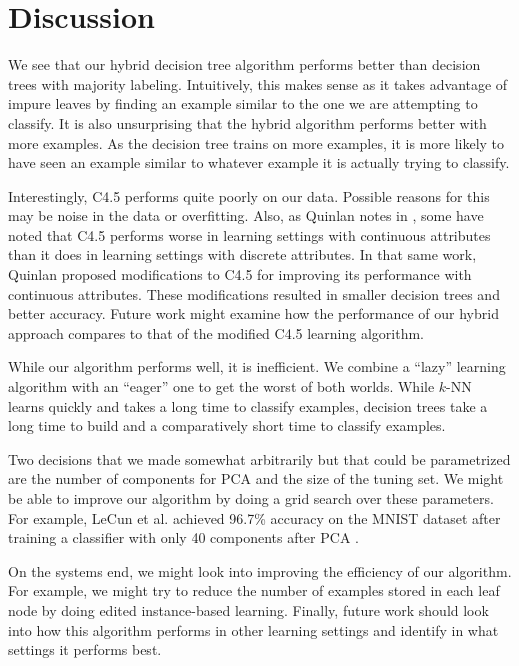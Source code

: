 \section{Discussion}

We see that our hybrid decision tree algorithm performs better than decision trees with majority labeling. Intuitively, this makes sense as it takes advantage of impure leaves by finding an example similar to the one we are attempting to classify. It is also unsurprising that the hybrid algorithm performs better with more examples. As the decision tree trains on more examples, it is more likely to have seen an example similar to whatever example it is actually trying to classify.

Interestingly, C4.5 performs quite poorly on our data. Possible reasons for this may be noise in the data or overfitting. Also, as Quinlan notes in \cite{quinlan1996improved}, some have noted that C4.5 performs worse in learning settings with continuous attributes than it does in learning settings with discrete attributes. In that same work, Quinlan proposed modifications to C4.5 for improving its performance with continuous attributes. These modifications resulted in smaller decision trees and better accuracy. Future work might examine how the performance of our hybrid approach compares to that of the modified C4.5 learning algorithm.

While our algorithm performs well, it is inefficient. We combine a ``lazy'' learning algorithm with an ``eager'' one to get the worst of both worlds. While $k$-NN learns quickly and takes a long time to classify examples, decision trees take a long time to build and a comparatively short time to classify examples.

Two decisions that we made somewhat arbitrarily but that could be parametrized are the number of components for PCA and the size of the tuning set. We might be able to improve our algorithm by doing a grid search over these parameters. For example, LeCun et al. achieved 96.7\% accuracy on the MNIST dataset after training a classifier with only 40 components after PCA \cite{lecun1998gradient}.

On the systems end, we might look into improving the efficiency of our algorithm. For example, we might try to reduce the number of examples stored in each leaf node by doing edited instance-based learning.
Finally, future work should look into how this algorithm performs in other learning settings and identify in what settings it performs best.
